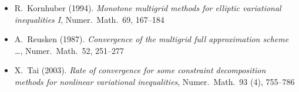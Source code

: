\begin{itemize}
\item R.~Kornhuber (1994). \emph{Monotone multigrid methods for elliptic variational inequalities I}, Numer.~Math.~69, 167--184 
\item A.~Reusken (1987). \emph{Convergence of the multigrid full approximation scheme \dots}, Numer.~Math.~52, 251--277 
\item X.~Tai (2003). \emph{Rate of convergence for some constraint decomposition methods for nonlinear variational inequalities}, Numer.~Math.~93 (4), 755--786 
\end{itemize}


